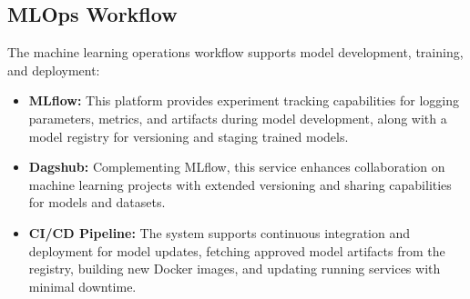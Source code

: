 \subsection{MLOps Workflow}
\label{subsection:mlops-workflow} %
The machine learning operations workflow supports model development, training, and deployment:

\begin{itemize}[leftmargin=80pt]
    \item \textbf{MLflow:} This platform provides experiment tracking capabilities for logging parameters, metrics, and artifacts during model development, along with a model registry for versioning and staging trained models.
    \item \textbf{Dagshub:} Complementing MLflow, this service enhances collaboration on machine learning projects with extended versioning and sharing capabilities for models and datasets.
    \item \textbf{CI/CD Pipeline:} The system supports continuous integration and deployment for model updates, fetching approved model artifacts from the registry, building new Docker images, and updating running services with minimal downtime.
\end{itemize}